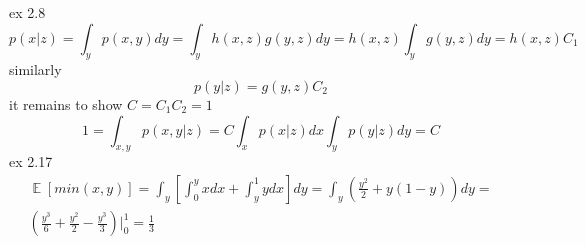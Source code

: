 \documentclass[12pt]{article}
\begin{document}
ex 2.8
\begin{equation}
p(x|z) = \int_{y} p(x,y)dy = \int_{y}h(x,z)g(y,z)dy = h(x,z)\int_{y}g(y,z)dy = h(x,z)C_1
\end{equation}
similarly
\begin{equation}
p(y|z) = g(y,z)C_2
\end{equation}
it remains to show $C = C_1C_2 = 1$
\begin{equation}
1 = \int_{x,y}p(x,y|z) = C\int_{x}p(x|z)dx\int_{y}p(y|z)dy = C 
\end{equation}
ex 2.17
\begin{equation}
\begin{split}
\displaystyle \mathop{\mathbb{E}}[min(x,y)] = \int_{y}[\int_{0}^{y}xdx + \int_{y}^{1}ydx]dy = \int_{y}(\frac{y^2}{2} + y(1-y))dy =\\ 
(\frac{y^3}{6} + \frac{y^2}{2} - \frac{y^3}{3}) \biggr\rvert_{0}^{1} = \frac{1}{3}
\end{split}
\end{equation}
\end{document}
